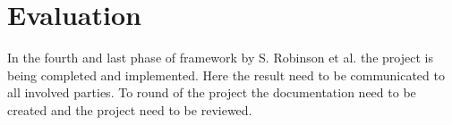 \section{Evaluation}\label{sec:methodEvaluation}

In the fourth and last phase of framework by S. Robinson et al. \cite{SecretsSuccessfulSimulation1995} the project is being completed and implemented.
Here the result need to be communicated to all involved parties.
To round of the project the documentation need to be created and the project need to be reviewed.

